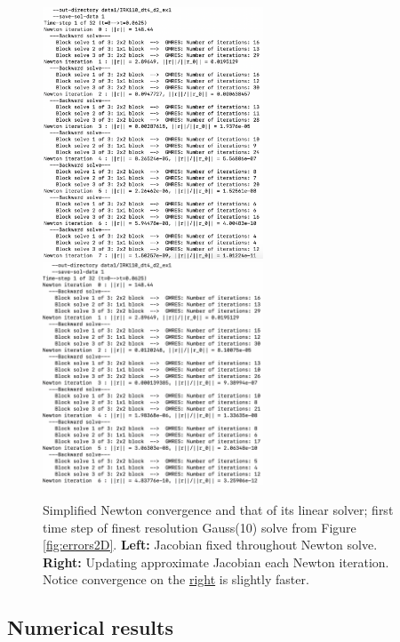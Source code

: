 \documentclass[review]{siamart}
\begin{document}
\begin{figure}[H]
\centerline{
\includegraphics[width = 0.585\textwidth]{figures/simple_newton_basic}
\quad
\includegraphics[width = 0.585\textwidth]{figures/simple_newton_better}
}
\caption{Simplified Newton convergence and that of its linear solver; first time step of finest resolution Gauss(10) solve from Figure \ref{fig:errors2D}.
\textbf{Left:} Jacobian fixed throughout Newton solve. \textbf{Right:} Updating approximate Jacobian each Newton iteration. Notice convergence on the \underline{right} is slightly faster.
\label{fig:simple_newton_convergence}
}
\end{figure}

\newpage
\subsection{Numerical results}
\end{document}
